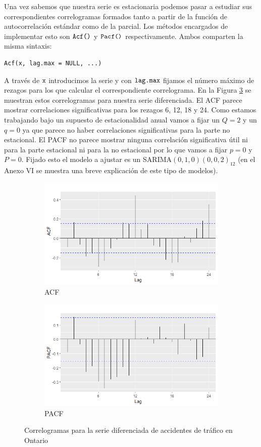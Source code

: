 Una vez sabemos que nuestra serie es estacionaria podemos pasar a estudiar sus correspondientes correlogramas formados tanto a partir de la función de autocorrelación estándar como de la parcial. Los métodos encargados de implementar esto son $\verb!Acf()!$ y $\verb!Pacf()!$ respectivamente. Ambos comparten la misma sintaxis:
\begin{Verbatim}[fontsize=\footnotesize]
Acf(x, lag.max = NULL, ...)
\end{Verbatim}

A través de $\verb!x!$ introducimos la serie y con $\verb!lag.max!$ fijamos el número máximo de rezagos para los que calcular el correspondiente correlograma. En la Figura \ref{corr} se muestran estos correlogramas para nuestra serie diferenciada. El ACF parece mostrar correlaciones significativas para los rezagos 6, 12, 18 y 24.  Como estamos trabajando bajo un supuesto de estacionalidad anual vamos a fijar un $Q = 2$ y un $q = 0$ ya que parece no haber correlaciones significativas para la parte no estacional. El PACF no parece mostrar ninguna correlación significativa útil ni para la parte estacional ni para la no estacional por lo que vamos a fijar $p = 0$ y $P = 0$. Fijado esto el modelo a ajustar es un SARIMA$(0,1,0)(0,0,2)_{12}$ (en el Anexo VI se muestra una breve explicación de este tipo de modelos).
\begin{figure} [t]
\begin{subfigure}{.5\textwidth}
  \centering
  \includegraphics[width=.8\linewidth]{Images/Modelizacion/3181.png}
  \caption{ACF}
  \label{fig:sfig1}
\end{subfigure}
\begin{subfigure}{.5\textwidth}
  \centering
  \includegraphics[width=.8\linewidth]{Images/Modelizacion/3182.png}
  \caption{PACF}
  \label{fig:sfig2}
\end{subfigure}
\caption{Correlogramas para la serie diferenciada de accidentes de tráfico en Ontario}
\label{corr}
\end{figure}

